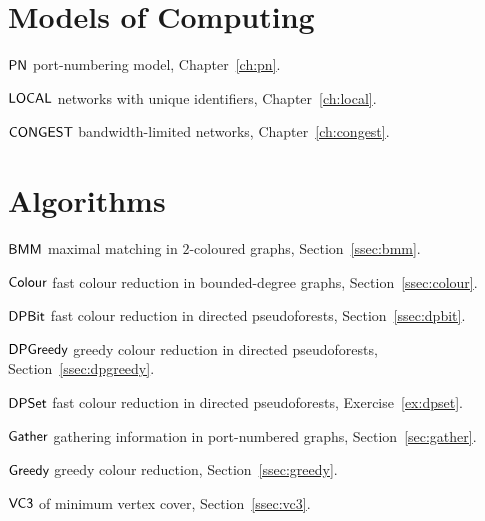 \section*{Models of Computing}

{\raggedright
\begin{notation}
    \item[$\textsf{PN}$] port-numbering model, Chapter~\ref{ch:pn}.
    \item[$\textsf{LOCAL}$] networks with unique identifiers, Chapter~\ref{ch:local}.
    \item[$\textsf{CONGEST}$] bandwidth-limited networks, Chapter~\ref{ch:congest}.
\end{notation}}

\section*{Algorithms}

{\raggedright
\begin{algorithms}
    \item[$\textsf{BMM}$] maximal matching in $2$-coloured graphs, Section~\ref{ssec:bmm}.
    \item[$\textsf{Colour}$] fast colour reduction in bounded-degree graphs, Section~\ref{ssec:colour}.
    \item[$\textsf{DPBit}$] fast colour reduction in directed pseudoforests, Section~\ref{ssec:dpbit}.
    \item[$\textsf{DPGreedy}$] greedy colour reduction in directed pseudoforests, Section~\ref{ssec:dpgreedy}.
    \item[$\textsf{DPSet}$] fast colour reduction in directed pseudoforests, Exercise~\ref{ex:dpset}.
    \item[$\textsf{Gather}$] gathering information in port-numbered graphs, Section~\ref{sec:gather}.
    \item[$\textsf{Greedy}$] greedy colour reduction, Section~\ref{ssec:greedy}.
    \item[$\textsf{VC3}$]  of minimum vertex cover, Section~\ref{ssec:vc3}.
\end{algorithms}}
